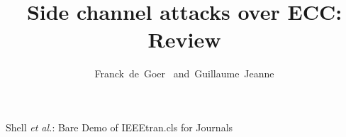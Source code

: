 \documentclass[journal]{IEEEtran}
\begin{document}
%
\title{Side channel attacks over ECC: Review}
%
%
%

\author{Franck~de~Goer~%
        and~Guillaume~Jeanne%
}

% 
%



{Shell \MakeLowercase{\textit{et al.}}: Bare Demo of IEEEtran.cls for Journals}
% 
\end{document}
